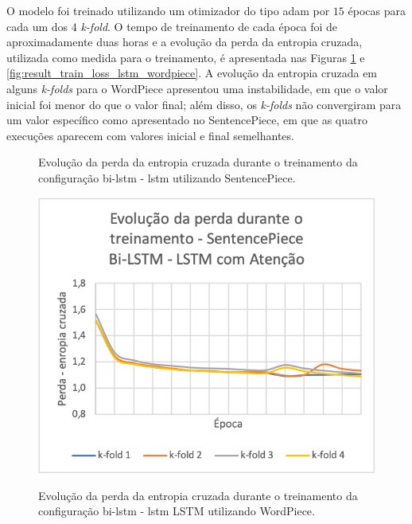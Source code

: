 O modelo foi treinado utilizando um otimizador do tipo \Gls{adam} por $15$ épocas para cada um dos $4$ \textit{k-fold}. O tempo de treinamento de cada época foi de aproximadamente duas horas e a evolução da perda da entropia cruzada, utilizada como medida para o treinamento, é apresentada nas Figuras \ref{fig:result_train_loss_lstm_sentencepiece} e \ref{fig:result_train_loss_lstm_wordpiece}. A evolução da entropia cruzada em alguns \textit{k-folds} para o WordPiece apresentou uma instabilidade, em que o valor inicial foi menor do que o valor final; além disso, os \textit{k-folds} não convergiram para um valor específico como apresentado no SentencePiece, em que as quatro execuções aparecem com valores inicial e final semelhantes.
\begin{figure}[htbp]
    \centering
    \begin{minipage}{0.49\textwidth}
        \centering
            \caption{Evolução da perda da entropia cruzada durante o treinamento da configuração \gls{bi-lstm} - \gls{lstm} utilizando SentencePiece.}
            \includegraphics[width=\textwidth]{resources/images/results/result_train_loss_sentencepiece_lstm_ptbr.png}
            \label{fig:result_train_loss_lstm_sentencepiece}
    \end{minipage} \hfill
    \begin{minipage}{0.49\textwidth}
        \centering
            \caption{Evolução da perda da entropia cruzada durante o treinamento da configuração \gls{bi-lstm} - \gls{lstm} LSTM utilizando WordPiece.}

\end{minipage}
\end{figure}
